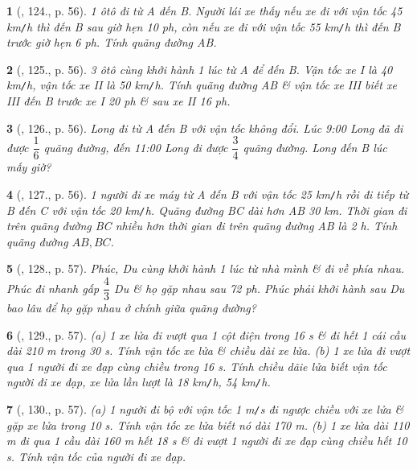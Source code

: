 \documentclass{article}
\newtheorem{baitoan}{}
\begin{document}
\begin{baitoan}[\cite{Binh_Toan_6_tap_2}, 124., p. 56]
	1 ôtô đi từ A đến B. Người lái xe thấy nếu xe đi với vận tốc {\rm45 km{\tt/}h} thì đến B sau giờ hẹn {\rm10 ph}, còn nếu xe đi với vận tốc {\rm55 km{\tt/}h} thì đến B trước giờ hẹn {\rm6 ph}. Tính quãng đường AB.
\end{baitoan}

\begin{baitoan}[\cite{Binh_Toan_6_tap_2}, 125., p. 56]
	3 ôtô cùng khởi hành 1 lúc từ A để đến B. Vận tốc xe I là {\rm40 km{\tt/}h}, vận tốc xe II là {\rm50 km{\tt/}h}. Tính quãng đường AB \& vận tốc xe III biết xe III đến B trước xe I {\rm20 ph} \& sau xe II {\rm16 ph}.
\end{baitoan}

\begin{baitoan}[\cite{Binh_Toan_6_tap_2}, 126., p. 56]
	Long đi từ A đến B với vận tốc không đổi. Lúc {\rm9:00} Long đã đi được $\dfrac{1}{6}$ quãng đường, đến {\rm11:00} Long đi được $\dfrac{3}{4}$ quãng đường. Long đến B lúc mấy giờ?
\end{baitoan}

\begin{baitoan}[\cite{Binh_Toan_6_tap_2}, 127., p. 56]
	1 người đi xe máy từ A đến B với vận tốc {\rm25 km{\tt/}h} rồi đi tiếp từ B đến C với vận tốc {\rm20 km{\tt/}h}. Quãng đường BC dài hơn AB {\rm30 km}. Thời gian đi trên quãng đường BC nhiều hơn thời gian đi trên quãng đường AB là {\rm2 h}. Tính quãng đường $AB,BC$.
\end{baitoan}

\begin{baitoan}[\cite{Binh_Toan_6_tap_2}, 128., p. 57]
	Phúc, Du cùng khởi hành 1 lúc từ nhà mình \& đi về phía nhau. Phúc đi nhanh gấp $\dfrac{4}{3}$ Du \& họ gặp nhau sau {\rm72 ph}. Phúc phải khởi hành sau Du bao lâu để họ gặp nhau ở chính giữa quãng đường?
\end{baitoan}

\begin{baitoan}[\cite{Binh_Toan_6_tap_2}, 129., p. 57]
	(a) 1 xe lửa đi vượt qua 1 cột điện trong {\rm16 s} \& đi hết 1 cái cầu dài {\rm210 m} trong {\rm30 s}. Tính vận tốc xe lửa \& chiều dài xe lửa. (b) 1 xe lửa đi vượt qua 1 người đi xe đạp cùng chiều trong {\rm16 s}. Tính chiều dãie lửa biết vận tốc người đi xe đạp, xe lửa lần lượt là {\rm18 km{\tt/}h, 54 km{\tt/}h}.
\end{baitoan}

\begin{baitoan}[\cite{Binh_Toan_6_tap_2}, 130., p. 57]
	(a) 1 người đi bộ với vận tốc {\rm1 m{\tt/}s} đi ngược chiều với xe lửa \& gặp xe lửa trong {\rm10 s}. Tính vận tốc xe lửa biết nó dài {\rm170 m}. (b) 1 xe lửa dài {\rm110 m} đi qua 1 cầu dài {\rm160 m} hết {\rm18 s} \& đi vượt 1 người đi xe đạp cùng chiều hết {\rm10 s}. Tính vận tốc của người đi xe đạp.
\end{baitoan}
\end{document}
